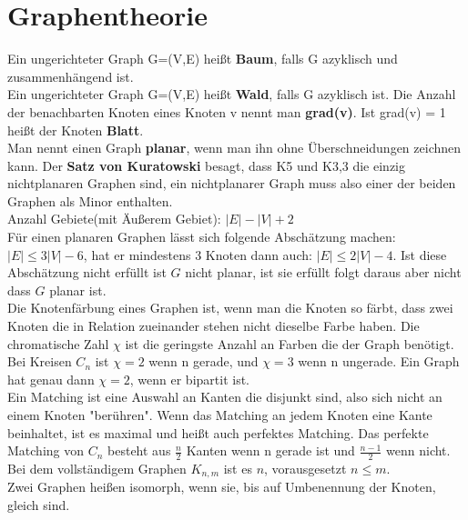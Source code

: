 \documentclass[11pt]{article}
\begin{document}
\section{Graphentheorie}
Ein ungerichteter Graph G=(V,E) hei{\ss}t {\bfseries Baum}, falls G azyklisch und zusammenh{\"a}ngend ist.\\
Ein ungerichteter Graph G=(V,E) hei{\ss}t {\bfseries Wald}, falls G azyklisch ist. Die Anzahl der benachbarten Knoten eines Knoten v nennt man {\bfseries grad(v)}. Ist grad(v) = 1 hei{\ss}t der Knoten {\bfseries Blatt}.  \\
Man nennt einen Graph {\bfseries planar}, wenn man ihn ohne {\"U}berschneidungen zeichnen kann. Der {\bfseries Satz von Kuratowski} besagt, dass K5 und K3,3 die einzig nichtplanaren Graphen sind, ein nichtplanarer Graph muss also einer der beiden Graphen als Minor enthalten.\\
Anzahl Gebiete(mit {\"A}u{\ss}erem Gebiet): $\mathopen| E \mathclose| -  \mathopen| V \mathclose| + 2$\\
F{\"u}r einen planaren Graphen l{\"a}sst sich folgende Absch{\"a}tzung machen: $|E|\leq 3|V|-6$, hat er mindestens 3 Knoten dann auch: $|E|\leq 2|V|-4$. Ist diese Absch{\"a}tzung nicht erf{\"u}llt ist $G$ nicht planar, ist sie erf{\"u}llt folgt daraus aber nicht dass $G$ planar ist.\\
Die Knotenf{\"a}rbung eines Graphen ist, wenn man die Knoten so f{\"a}rbt, dass zwei Knoten die in Relation zueinander stehen nicht dieselbe Farbe haben. Die chromatische Zahl $\chi$ ist die geringste Anzahl an Farben die der Graph ben{\"o}tigt. Bei Kreisen $C_n$ ist $\chi = 2$ wenn n gerade, und $\chi = 3$ wenn n ungerade. Ein Graph hat genau dann $\chi = 2$, wenn er bipartit ist.\\ 
Ein Matching ist eine Auswahl an Kanten die disjunkt sind, also sich nicht an einem Knoten "ber{\"u}hren". Wenn das Matching an jedem Knoten eine Kante beinhaltet, ist es maximal und hei{\ss}t auch perfektes Matching. Das perfekte Matching von $C_n$ besteht aus $\frac{n}{2}$ Kanten wenn n gerade ist und $\frac{n-1}{2}$ wenn nicht. Bei dem vollst{\"a}ndigem Graphen $K_{n,m}$ ist es $n$, vorausgesetzt $n\leq m$.\\
Zwei Graphen hei{\ss}en isomorph, wenn sie, bis auf Umbenennung der Knoten, gleich sind.
\end{document}
